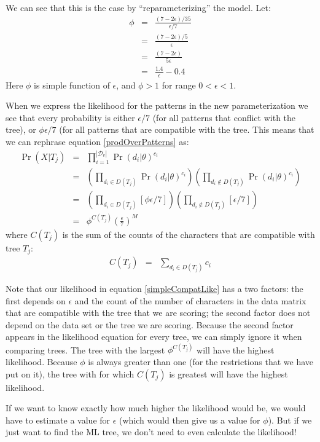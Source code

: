 \documentclass[11pt]{article}
\newcommand{\variablePatternSpace}{\ensuremath{\mathcal{D}_v}}
\begin{document}
We can see that this is the case by ``reparameterizing'' the model.
Let:
\begin{eqnarray}
	\phi & = & \frac{(7-2\epsilon)/35}{\epsilon/7} \\
		& = & \frac{(7-2\epsilon)/5}{\epsilon}\\
		& = & \frac{(7-2\epsilon)}{5\epsilon} \\
		& = & \frac{1.4}{\epsilon} - 0.4
\end{eqnarray}
Here $\phi$ is simple function of $\epsilon$, and $\phi > 1$ for range $0<\epsilon < 1$.

When we express the likelihood for the patterns in the new parameterization we see that every
probability is either $\epsilon/7$ (for all patterns that conflict with the tree), or $\phi\epsilon/7$
(for all patterns that are compatible with the tree.
This means that we can rephrase equation \ref{prodOverPatterns} as:
\begin{eqnarray}
	\Pr(X|T_j)  & = & \prod_{i=1}^{|\variablePatternSpace|}\Pr(d_i|\theta)^{c_i} \\
				& = & \left(\prod_{d_i\in D(T_j)}\Pr(d_i|\theta)^{c_i} \right) \left(\prod_{d_i\notin D(T_j)}\Pr(d_i|\theta)^{c_i} \right)\\
				& = & \left(\prod_{d_i\in D(T_j)}[\phi\epsilon/7] \right) \left(\prod_{d_i\notin D(T_j)}[\epsilon/7] \right)\\
				& = & \phi^{C(T_j)}\left(\frac{\epsilon}{7}\right)^{M} \label{simpleCompatLike}
\end{eqnarray}
where $C(T_j)$ is the sum of the counts of the characters that are compatible with tree $T_j$:
\begin{eqnarray}
	C(T_j)  & = & \sum_{d_i\in D(T_j)}c_i
\end{eqnarray}

Note that our likelihood in equation \ref{simpleCompatLike} has a two factors:
the first depends on $\epsilon$ and the count of the number of characters in the data matrix that are
compatible with the tree that we are scoring;
the second factor does not depend on the data set or the tree we are scoring.
Because the second factor appears in the likelihood equation for every tree, we can simply ignore it
when comparing trees.
The tree with the largest $\phi^{C(T_j)}$ will have the highest likelihood.
Because $\phi$ is always greater than one (for the restrictions that we have put on it),
the tree with for which $C(T_j)$ is greatest will have the highest likelihood.

If we want to know exactly how much higher the likelihood would be, we would have to estimate a value
for $\epsilon$ (which would then give us a value for $\phi$).
But if we just want to find the ML tree, we don't need to even calculate the likelihood!
\end{document}
